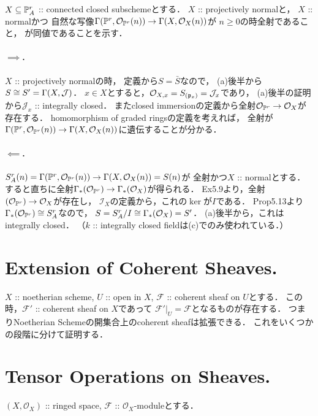 \documentclass[a4paper]{jsarticle}
\newcommand{\shF}{\mathcal{F}}
\newcommand{\shI}{\mathcal{I}}
\newcommand{\shJ}{\mathcal{J}}
\newcommand{\shO}{\mathcal{O}}
\begin{document}
    $X \subseteq \mathbb{P}^r_A$ :: connected closed subschemeとする．
    $X$ :: projectively normalと，
    $X$ :: normalかつ
    自然な写像$\Gamma(\proj^r, \shO_{\proj^r}(n)) \to \Gamma(X,\shO_X(n))$が
    $n \geq 0$の時全射であること，
    が同値であることを示す．

    \paragraph{$\implies$.}
    $X$ :: projectively normalの時，
    定義から$S=\bar{S}$なので，
    (a)後半から$S \iso S'=\Gamma(X,\shJ)$．
    $x \in X$とすると，$\shO_{X,x}=S_{(\I{p}_x)}=\shJ_x$であり，
    (a)後半の証明から$\shJ_x$ :: integrally closed．
    またclosed immersionの定義から全射$\shO_{\proj^r} \to \shO_{X}$が存在する．
    homomorphism of graded ringsの定義を考えれば，
    全射が$\Gamma(\proj^r, \shO_{\proj^r}(n)) \to \Gamma(X,\shO_X(n))$に遺伝することが分かる．

    \paragraph{$\impliedby$.}
    $S_A^r(n)=\Gamma(\proj^r, \shO_{\proj^r}(n)) \to \Gamma(X,\shO_X(n))=S(n)$が
    全射かつ$X$ :: normalとする．
    すると直ちに全射$\Gamma_*(\shO_{\proj^r}) \to \Gamma_*(\shO_X)$が得られる．
    Ex5.9より，全射$(\shO_{\proj^r}) \to \shO_X$が存在し，
    $\shI_X$の定義から，これの$\ker$が$I$である．
    Prop5.13より$\Gamma_*(\shO_{\proj^r}) \iso S_A^r$なので，
    $S=S_A^r/I \iso \Gamma_*(\shO_X)=S'$．
    (a)後半から，これはintegrally closed．
    （$k$ :: integrally closed fieldは(c)でのみ使われている．）

\section{Extension of Coherent Sheaves.} %
    $X$ :: noetherian scheme, $U$ :: open in $X$, 
    $\shF$ :: coherent sheaf on $U$とする．
    この時，$\shF'$ :: coherent sheaf on $X$であって
    $\shF'|_U=\shF$となるものが存在する．
    つまりNoetherian Schemeの開集合上のcoherent sheafは拡張できる．
    これをいくつかの段階に分けて証明する．

\section{Tensor Operations on Sheaves.} %
    $(X, \shO_X)$ :: ringed space, $\shF$ :: $\shO_X$-moduleとする．
\end{document}
